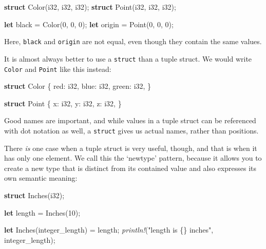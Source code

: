 \documentclass[a4paper,]{book}
\newenvironment{Shaded}{\begin{snugshade}}{\end{snugshade}}
\newcommand{\KeywordTok}[1]{\textcolor[rgb]{0.13,0.29,0.53}{\textbf{{#1}}}}
\newcommand{\DataTypeTok}[1]{\textcolor[rgb]{0.13,0.29,0.53}{{#1}}}
\newcommand{\DecValTok}[1]{\textcolor[rgb]{0.00,0.00,0.81}{{#1}}}
\newcommand{\StringTok}[1]{\textcolor[rgb]{0.31,0.60,0.02}{{#1}}}
\newcommand{\PreprocessorTok}[1]{\textcolor[rgb]{0.56,0.35,0.01}{\textit{{#1}}}}
\newcommand{\NormalTok}[1]{{#1}}
\begin{document}
\begin{Shaded}
\begin{Highlighting}[]
\KeywordTok{struct} \NormalTok{Color(}\DataTypeTok{i32}\NormalTok{, }\DataTypeTok{i32}\NormalTok{, }\DataTypeTok{i32}\NormalTok{);}
\KeywordTok{struct} \NormalTok{Point(}\DataTypeTok{i32}\NormalTok{, }\DataTypeTok{i32}\NormalTok{, }\DataTypeTok{i32}\NormalTok{);}

\KeywordTok{let} \NormalTok{black = Color(}\DecValTok{0}\NormalTok{, }\DecValTok{0}\NormalTok{, }\DecValTok{0}\NormalTok{);}
\KeywordTok{let} \NormalTok{origin = Point(}\DecValTok{0}\NormalTok{, }\DecValTok{0}\NormalTok{, }\DecValTok{0}\NormalTok{);}
\end{Highlighting}
\end{Shaded}

Here, \texttt{black} and \texttt{origin} are not equal, even though they
contain the same values.

It is almost always better to use a \texttt{struct} than a tuple struct.
We would write \texttt{Color} and \texttt{Point} like this instead:

\begin{Shaded}
\begin{Highlighting}[]
\KeywordTok{struct} \NormalTok{Color \{}
    \NormalTok{red: }\DataTypeTok{i32}\NormalTok{,}
    \NormalTok{blue: }\DataTypeTok{i32}\NormalTok{,}
    \NormalTok{green: }\DataTypeTok{i32}\NormalTok{,}
\NormalTok{\}}

\KeywordTok{struct} \NormalTok{Point \{}
    \NormalTok{x: }\DataTypeTok{i32}\NormalTok{,}
    \NormalTok{y: }\DataTypeTok{i32}\NormalTok{,}
    \NormalTok{z: }\DataTypeTok{i32}\NormalTok{,}
\NormalTok{\}}
\end{Highlighting}
\end{Shaded}

Good names are important, and while values in a tuple struct can be
referenced with dot notation as well, a \texttt{struct} gives us actual
names, rather than positions.

There \emph{is} one case when a tuple struct is very useful, though, and
that is when it has only one element. We call this the `newtype'
pattern, because it allows you to create a new type that is distinct
from its contained value and also expresses its own semantic meaning:

\begin{Shaded}
\begin{Highlighting}[]
\KeywordTok{struct} \NormalTok{Inches(}\DataTypeTok{i32}\NormalTok{);}

\KeywordTok{let} \NormalTok{length = Inches(}\DecValTok{10}\NormalTok{);}

\KeywordTok{let} \NormalTok{Inches(integer_length) = length;}
\PreprocessorTok{println!}\NormalTok{(}\StringTok{"length is \{\} inches"}\NormalTok{, integer_length);}
\end{Highlighting}
\end{Shaded}
\end{document}

